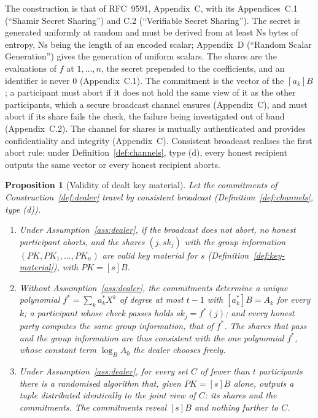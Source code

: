 \documentclass[11pt,a4paper]{article}
\newtheorem{proposition}[theorem]{Proposition}
\theoremstyle{definition}
\begin{document}
The construction is that of RFC~9591, Appendix~C, with its Appendices~C.1
(``Shamir Secret Sharing'') and C.2 (``Verifiable Secret Sharing''). The
secret is generated uniformly at random and must be derived from at least
\(\mathrm{Ns}\) bytes of entropy, \(\mathrm{Ns}\) being the length of an
encoded scalar; Appendix~D (``Random Scalar Generation'') gives the
generation of uniform scalars. The shares are the evaluations of \(f\) at
\(1, \dots, n\), the secret prepended to the coefficients, and an identifier
is never \(0\) (Appendix~C.1). The commitment is the vector of the
\([a_k]B\); a participant must abort if it does not hold the same view of it
as the other participants, which a secure broadcast channel ensures
(Appendix~C), and must abort if its share fails the check, the failure being
investigated out of band (Appendix~C.2). The channel for shares is mutually
authenticated and provides confidentiality and integrity (Appendix~C).
Consistent broadcast realises the
first abort rule: under Definition~\ref{def:channels}, type (d), every honest
recipient outputs the same vector or every honest recipient aborts.

\begin{proposition}[Validity of dealt key material]\label{prop:dealer-valid}
Let the commitments of Construction~\ref{def:dealer} travel by consistent
broadcast (Definition~\ref{def:channels}, type (d)).
\begin{enumerate}
\item[(i)] Under Assumption~\ref{ass:dealer}, if the broadcast does not
  abort, no honest participant aborts, and the shares
  \((j, \mathit{sk}_j)\) with the group information
  \((\mathit{PK}, \mathit{PK}_1, \dots, \mathit{PK}_n)\) are valid key
  material for \(s\) (Definition~\ref{def:key-material}), with
  \(\mathit{PK} = [s]B\).
\item[(ii)] Without Assumption~\ref{ass:dealer}, the commitments determine a
  unique polynomial \(f^{*} = \sum_{k} a^{*}_k X^k\) of degree at most
  \(t - 1\) with \([a^{*}_k]B = A_k\) for every \(k\); a participant whose
  check passes holds \(\mathit{sk}_j = f^{*}(j)\); and every honest party
  computes the same group information, that of \(f^{*}\). The shares that
  pass and the group information are thus consistent with the one
  polynomial \(f^{*}\), whose constant term \(\log_B A_0\) the dealer
  chooses freely.
\item[(iii)] Under Assumption~\ref{ass:dealer}, for every set \(C\) of fewer
  than \(t\) participants there is a randomised algorithm that, given
  \(\mathit{PK} = [s]B\) alone, outputs a tuple distributed identically to
  the joint view of \(C\): its shares and the commitments. The commitments
  reveal \([s]B\) and nothing further to \(C\).
\end{enumerate}
\end{proposition}
\end{document}
